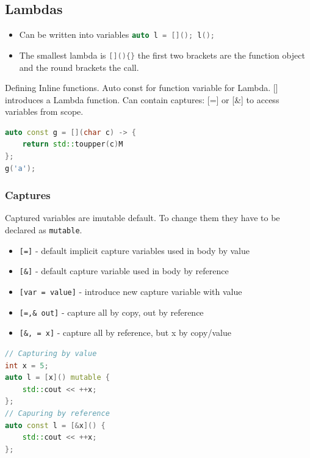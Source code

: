 \subsection{Lambdas}
\begin{itemize}
  \itemsep -0.5em 
  \item Can be written into variables \lstinline[language=C++]|auto l = [](); l();|
  \item The smallest lambda is \lstinline[language=C++]|[](){}| the first two brackets are the function object and the round brackets the call.
\end{itemize}

Defining Inline functions. Auto const for function variable for Lambda. [] introduces a Lambda function. Can contain captures: [=] or [\&] to access variables from scope.
\begin{lstlisting}[language=C++]
auto const g = [](char c) -> {
	return std::toupper(c)M
};
g('a');
\end{lstlisting}

\subsubsection{Captures}
Captured variables are imutable default. To change them they have to be declared as \lstinline|mutable|.
\begin{itemize}
	\itemsep -0.5em
	\item \lstinline|[=]| - default implicit capture variables used in body by value
	\item \lstinline|[&]| - default capture variable used in body by reference
	\item \lstinline|[var = value]| - introduce new capture variable with value
	\item \lstinline|[=,& out]| - capture all by copy, out by reference 
	\item \lstinline|[&, = x]| - capture all by reference, but x by copy/value
\end{itemize}
\begin{lstlisting}[language=C++]
// Capturing by value
int x = 5;
auto l = [x]() mutable {
	std::cout << ++x;
};
// Capuring by reference
auto const l = [&x]() {
	std::cout << ++x;
};
\end{lstlisting}


